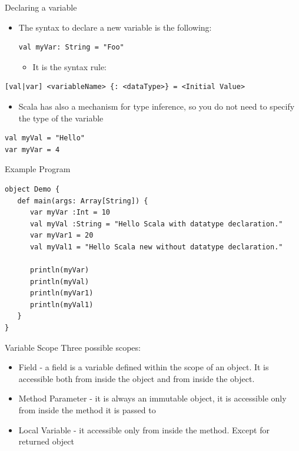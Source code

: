 \documentclass[presentation, aspectratio=169]{beamer}
\begin{document}
\begin{frame}[label={sec:orgc16784c},fragile]{Declaring a variable}
 \begin{itemize}
\item The syntax to declare a new variable is the following:
\begin{verbatim}
val myVar: String = "Foo"
\end{verbatim}

\begin{itemize}
\item It is the syntax rule:
\end{itemize}
\end{itemize}
\begin{verbatim}
[val|var] <variableName> {: <dataType>} = <Initial Value>
\end{verbatim}

\begin{itemize}
\item Scala has also a mechanism for type inference, so you do not need to specify the 
type of the variable
\end{itemize}
\begin{verbatim}
val myVal = "Hello"
var myVar = 4
\end{verbatim}
\end{frame}
\begin{frame}[label={sec:orgada4a43},fragile]{Example Program}
 \begin{verbatim}
object Demo {
   def main(args: Array[String]) {
      var myVar :Int = 10
      val myVal :String = "Hello Scala with datatype declaration."
      var myVar1 = 20
      val myVal1 = "Hello Scala new without datatype declaration."

      println(myVar)
      println(myVal)
      println(myVar1)
      println(myVal1)
   }
}
\end{verbatim}
\end{frame}

\begin{frame}[label={sec:orga5da840}]{Variable Scope}
Three possible scopes:
\begin{itemize}
\item Field - a field is a variable defined within the scope of an object.
It is accessible both from inside the object and from inside the object.
\item Method Parameter - it is always an immutable object, it is accessible only from 
inside the method it is passed to
\item Local Variable - it accessible only from inside the method. Except for 
returned object
\end{itemize}
\end{frame}
\end{document}
